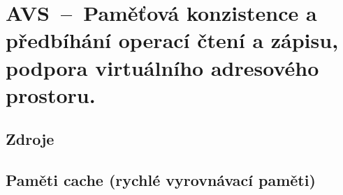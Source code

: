 

\graphicspath{{avs/pametova_konzistence/figures}}


\chapter{AVS~--~Paměťová konzistence a předbíhání operací čtení a zápisu, podpora virtuálního adresového prostoru.}


\section{Zdroje}

\begin{compactitem}
    \item {}
    \item {}
    \item {}
    \item {}
\end{compactitem}


\section{Paměti cache (rychlé vyrovnávací paměti)}

